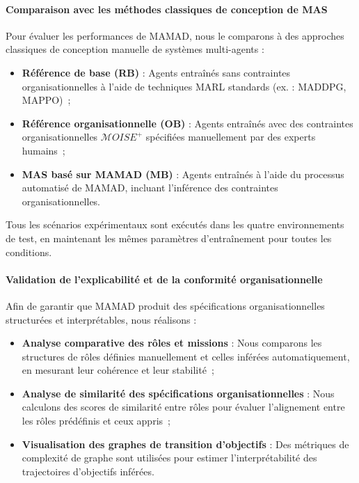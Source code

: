 \paragraph{Comparaison avec les méthodes classiques de conception de MAS}

Pour évaluer les performances de MAMAD, nous le comparons à des approches classiques de conception manuelle de systèmes multi-agents :

\begin{itemize}
    \item \textbf{Référence de base (RB)} : Agents entraînés sans contraintes organisationnelles à l'aide de techniques MARL standards (ex. : MADDPG, MAPPO)~;
    \item \textbf{Référence organisationnelle (OB)} : Agents entraînés avec des contraintes organisationnelles $\mathcal{M}OISE^+$ spécifiées manuellement par des experts humains~;
    \item \textbf{MAS basé sur MAMAD (MB)} : Agents entraînés à l'aide du processus automatisé de MAMAD, incluant l'inférence des contraintes organisationnelles.
\end{itemize}

Tous les scénarios expérimentaux sont exécutés dans les quatre environnements de test, en maintenant les mêmes paramètres d'entraînement pour toutes les conditions.

\paragraph{Validation de l'explicabilité et de la conformité organisationnelle}

Afin de garantir que MAMAD produit des spécifications organisationnelles structurées et interprétables, nous réalisons :

\begin{itemize}
    \item \textbf{Analyse comparative des rôles et missions} : Nous comparons les structures de rôles définies manuellement et celles inférées automatiquement, en mesurant leur cohérence et leur stabilité~;
    \item \textbf{Analyse de similarité des spécifications organisationnelles} : Nous calculons des scores de similarité entre rôles pour évaluer l'alignement entre les rôles prédéfinis et ceux appris~;
    \item \textbf{Visualisation des graphes de transition d'objectifs} : Des métriques de complexité de graphe sont utilisées pour estimer l'interprétabilité des trajectoires d'objectifs inférées.
\end{itemize}


